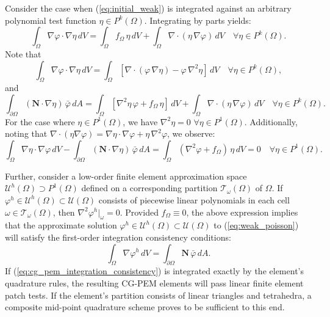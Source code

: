 	Consider the case when (\ref{eq:initial_weak}) is integrated against an arbitrary polynomial test function $\eta \in P^k (\Omega)$. Integrating by parts yields:
	\begin{equation}
		\int_\Omega \nabla \varphi \cdot \nabla \eta \, dV = \int_\Omega f_{\Omega} \, \eta \, dV + \int_{\Omega} \nabla \cdot (\eta \, \nabla \varphi) \, dV \quad \forall \eta \in P^k (\Omega).
	\end{equation}
	Note that
	\begin{equation}
		\int_\Omega \nabla \varphi \cdot \nabla \eta \, dV = \int_\Omega \left[ \nabla \cdot (\varphi \, \nabla \eta) - \varphi \, \nabla^2 \eta \right] \, dV \quad \forall \eta \in P^k (\Omega),
	\end{equation}
	and
	\begin{equation}
		\int_{\partial \Omega} (\mathbf{N} \cdot \nabla \eta) \, \bar{\varphi} \, dA = \int_\Omega \left[ \nabla^2 \eta \, \varphi + f_{\Omega} \, \eta \right] \, dV + \int_{\Omega} \nabla \cdot (\eta \, \nabla \varphi) \, dV \quad \forall \eta \in P^k (\Omega).
	\end{equation}
	For the case where $\eta \in P^1 (\Omega)$, we have $\nabla^2 \eta = 0 \, \, \forall \eta \in P^1 (\Omega)$. Additionally, noting that $\nabla \cdot (\eta \nabla \varphi) = \nabla \eta \cdot \nabla \varphi + \eta \, \nabla^2 \varphi$, we observe:
	\begin{equation}
		\int_{\Omega} \nabla \eta \cdot \nabla \varphi \, dV - \int_{\partial \Omega} (\mathbf{N} \cdot \nabla \eta) \, \bar{\varphi} \, dA = \int_\Omega (\nabla^2 \varphi + f_{\Omega}) \, \eta \, dV = 0 \quad \forall \eta \in P^1 (\Omega).
	\end{equation}
	
	Further, consider a low-order finite element approximation space $\mathcal{U}^h (\Omega) \supset P^1 (\Omega)$ defined on a corresponding partition $\mathcal{T}_\omega (\Omega)$ of $\Omega$. If $\varphi^h \in \mathcal{U}^h (\Omega) \subset \mathcal{U} (\Omega)$ consists of piecewise linear polynomials in each cell $\omega \in \mathcal{T}_\omega (\Omega)$, then $\nabla^2 \varphi^h|_{\omega} = 0$. Provided $f_{\Omega} \equiv 0$, the above expression implies that the approximate solution $\varphi^h \in \mathcal{U}^h (\Omega) \subset \mathcal{U} (\Omega)$ to (\ref{eq:weak_poisson}) will satisfy the first-order integration consistency conditions:
	\begin{equation}
		\int_{\Omega} \nabla \varphi^h \, dV = \int_{\partial \Omega} \mathbf{N} \, \bar{\varphi} \, dA.
		\label{eq:cg_pem_integration_consistency}
	\end{equation}
	If (\ref{eq:cg_pem_integration_consistency}) is integrated exactly by the element's quadrature rules, the resulting CG-PEM elements will pass linear finite element patch tests. If the element's partition consists of linear triangles and tetrahedra, a composite mid-point quadrature scheme proves to be sufficient to this end.

